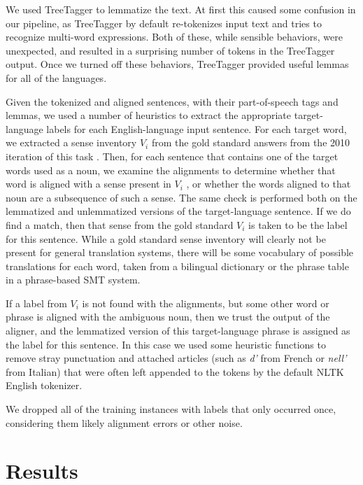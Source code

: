 \documentclass[11pt,letterpaper]{article}
\begin{document}
We used TreeTagger \cite{Schmid95improvementsin} to lemmatize the text. At
first this caused some confusion in our pipeline, as TreeTagger by default
re-tokenizes input text and tries to recognize multi-word expressions. Both of
these, while sensible behaviors, were unexpected, and resulted in a surprising 
number of tokens in the TreeTagger output. Once we turned off these behaviors,
TreeTagger provided useful lemmas for all of the languages.

Given the tokenized and aligned sentences, with their part-of-speech tags and
lemmas, we used a number of heuristics to extract the appropriate
target-language labels for each English-language input sentence.  For each
target word, we extracted a sense inventory $V_i$ from the gold standard
answers from the 2010 iteration of this task \cite{lefever-hoste:2009:SEW}.
Then, for each sentence that contains one of the target words used as a noun,
we examine the alignments to determine whether that word is aligned with a
sense present in $V_i$ , or whether the words aligned to that noun are a
subsequence of such a sense. The same check is performed both on the lemmatized
and unlemmatized versions of the target-language sentence. If we do find a
match, then that sense from the gold standard $V_i$ is taken to be the label
for this sentence. While a gold standard sense inventory will clearly not be
present for general translation systems, there will be some vocabulary of
possible translations for each word, taken from a bilingual dictionary or the
phrase table in a phrase-based SMT system.

If a label from $V_i$ is not found with the alignments, but some other word or
phrase is aligned with the ambiguous noun, then we trust the output of the
aligner, and the lemmatized version of this target-language phrase is assigned
as the label for this sentence. In this case we used some heuristic functions
to remove stray punctuation and attached articles (such as \emph{d'} from
French or \emph{nell'} from Italian) that were often left appended to the
tokens by the default NLTK English tokenizer.

We dropped all of the training instances with labels that only occurred once,
considering them likely alignment errors or other noise.

\section{Results}
\end{document}
